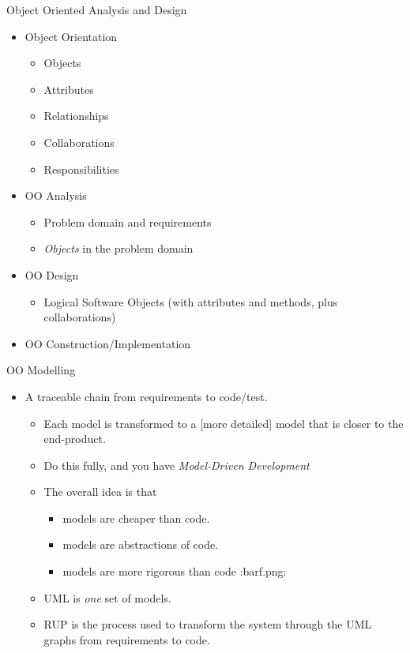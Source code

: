 \documentclass[10pt,t,a4paper]{beamer}
\begin{document}
\begin{frame}[label=sec-11]{Object Oriented Analysis and Design}
\begin{itemize}
\item Object Orientation
\begin{itemize}
\item Objects
\item Attributes
\item Relationships
\item Collaborations
\item Responsibilities
\end{itemize}
\item OO Analysis
\begin{itemize}
\item Problem domain and requirements
\item \emph{Objects} in the problem domain
\end{itemize}
\item OO Design
\begin{itemize}
\item Logical Software Objects (with attributes and methods, plus collaborations)
\end{itemize}
\item OO Construction/Implementation
\end{itemize}
\end{frame}
\begin{frame}[label=sec-12]{OO Modelling}
\begin{itemize}
\item A traceable chain from requirements to code/test.
\begin{itemize}
\item Each model is transformed to a [more detailed] model that is closer to the end-product.
\item Do this fully, and you have \emph{Model-Driven Development}
\item The overall idea is that
\begin{itemize}
\item models are cheaper than code.
\item models are abstractions of code.
\item models are more rigorous than code :barf.png:
\end{itemize}
\item UML is \emph{one} set of models.
\item RUP is the process used to transform the system through the UML graphs from requirements to code.
\end{itemize}
\end{itemize}
\end{frame}
\end{document}
